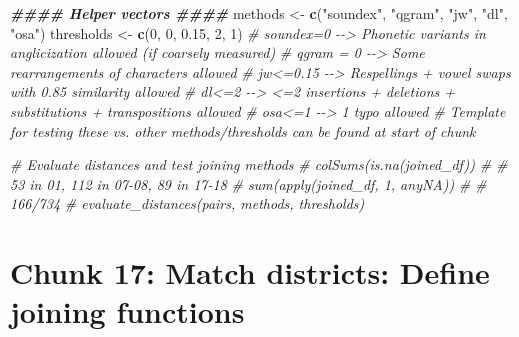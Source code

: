 \documentclass[
]{article}
\newenvironment{Shaded}{\begin{snugshade}}{\end{snugshade}}
\newcommand{\CommentTok}[1]{\textcolor[rgb]{0.56,0.35,0.01}{\textit{#1}}}
\newcommand{\DecValTok}[1]{\textcolor[rgb]{0.00,0.00,0.81}{#1}}
\newcommand{\DocumentationTok}[1]{\textcolor[rgb]{0.56,0.35,0.01}{\textbf{\textit{#1}}}}
\newcommand{\FloatTok}[1]{\textcolor[rgb]{0.00,0.00,0.81}{#1}}
\newcommand{\FunctionTok}[1]{\textcolor[rgb]{0.13,0.29,0.53}{\textbf{#1}}}
\newcommand{\NormalTok}[1]{#1}
\newcommand{\OtherTok}[1]{\textcolor[rgb]{0.56,0.35,0.01}{#1}}
\newcommand{\StringTok}[1]{\textcolor[rgb]{0.31,0.60,0.02}{#1}}
\begin{document}
\begin{Shaded}
\begin{Highlighting}[]
\DocumentationTok{\#\#\#\# Helper vectors \#\#\#\#}
\NormalTok{methods }\OtherTok{\textless{}{-}} \FunctionTok{c}\NormalTok{(}\StringTok{"soundex"}\NormalTok{, }\StringTok{"qgram"}\NormalTok{, }\StringTok{"jw"}\NormalTok{, }\StringTok{"dl"}\NormalTok{, }\StringTok{"osa"}\NormalTok{)}
\NormalTok{thresholds }\OtherTok{\textless{}{-}} \FunctionTok{c}\NormalTok{(}\DecValTok{0}\NormalTok{, }\DecValTok{0}\NormalTok{, }\FloatTok{0.15}\NormalTok{, }\DecValTok{2}\NormalTok{, }\DecValTok{1}\NormalTok{)}
\CommentTok{\# soundex=0 {-}{-}\textgreater{} Phonetic variants in anglicization allowed (if coarsely measured)}
\CommentTok{\# qgram = 0 {-}{-}\textgreater{} Some rearrangements of characters allowed}
\CommentTok{\# jw\textless{}=0.15 {-}{-}\textgreater{} Respellings + vowel swaps with 0.85 similarity allowed}
\CommentTok{\# dl\textless{}=2 {-}{-}\textgreater{} \textless{}=2 insertions + deletions + substitutions + transpositions allowed}
\CommentTok{\# osa\textless{}=1 {-}{-}\textgreater{} 1 typo allowed}
\CommentTok{\# Template for testing these vs. other methods/thresholds can be found at start of chunk}


\CommentTok{\# Evaluate distances and test joining methods}
\CommentTok{\# colSums(is.na(joined\_df))}
\CommentTok{\# \# 53 in 01, 112 in 07{-}08, 89 in 17{-}18}
\CommentTok{\# sum(apply(joined\_df, 1, anyNA))}
\CommentTok{\# \# 166/734}
\CommentTok{\# evaluate\_distances(pairs, methods, thresholds)}
\end{Highlighting}
\end{Shaded}

\section*{Chunk 17: Match districts: Define joining functions}\label{chunk-17-match-districts-define-joining-functions}
\end{document}
